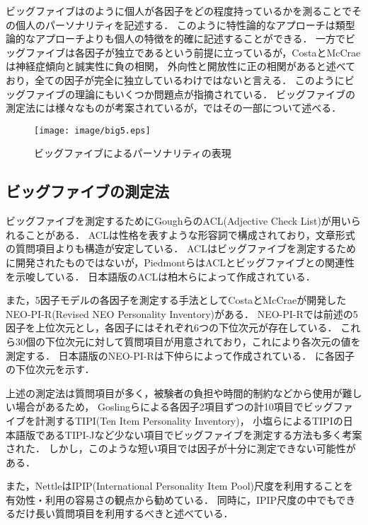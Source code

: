 ビッグファイブはのように個人が各因子をどの程度持っているかを測ることでその個人のパーソナリティを記述する．
このように特性論的なアプローチは類型論的なアプローチよりも個人の特徴を的確に記述することができる．
一方でビッグファイブは各因子が独立であるという前提に立っているが，CostaとMcCrae\cite{neo-pi-r}は神経症傾向と誠実性に負の相関，
外向性と開放性に正の相関があると述べており，全ての因子が完全に独立しているわけではないと言える\cite{eysenck-handbook}．
このようにビッグファイブの理論にもいくつか問題点が指摘されている．
ビッグファイブの測定法には様々なものが考案されているが，ではその一部について述べる．


\begin{figure}[htb]
    \centering
    \texttt{[image: image/big5.eps]}
    \caption{ビッグファイブによるパーソナリティの表現}
    \label{fig:big5}
\end{figure}

\subsection{ビッグファイブの測定法}
\label{sec:mesure}
ビッグファイブを測定するためにGoughら\cite{acl}のACL(Adjective Check List)が用いられることがある．
ACLは性格を表すような形容詞で構成されており，文章形式の質問項目よりも構造が安定している．
ACLはビッグファイブを測定するために開発されたものではないが，Piedmontら\cite{big5-acl}はACLとビッグファイブとの関連性を示唆している．
日本語版のACLは柏木ら\cite{acl-ja}によって作成されている．

また，5因子モデルの各因子を測定する手法としてCostaとMcCrae\cite{neo-pi-r}が開発したNEO-PI-R(Revised NEO Personality Inventory)がある．
NEO-PI-Rでは前述の5因子を上位次元とし，各因子にはそれぞれ6つの下位次元が存在している．
これら30個の下位次元に対して質問項目が用意されており，これにより各次元の値を測定する．
日本語版のNEO-PI-Rは下仲ら\cite{neo-pi-r-ja}によって作成されている．
に各因子の下位次元を示す．

上述の測定法は質問項目が多く，被験者の負担や時間的制約などから使用が難しい場合があるため，
Goslingら\cite{tipi}による各因子2項目ずつの計10項目でビッグファイブを計測するTIPI(Ten Item Personality Inventory)，
小塩ら\cite{tipi-j}によるTIPIの日本語版であるTIPI-Jなど少ない項目でビッグファイブを測定する方法も多く考案された．
しかし，このような短い項目では因子が十分に測定できない可能性がある．

また，Nettle\cite{daniel}はIPIP(International Personality Item Pool)尺度を利用することを有効性・利用の容易さの観点から勧めている．
同時に，IPIP尺度の中でもできるだけ長い質問項目を利用するべきと述べている．

